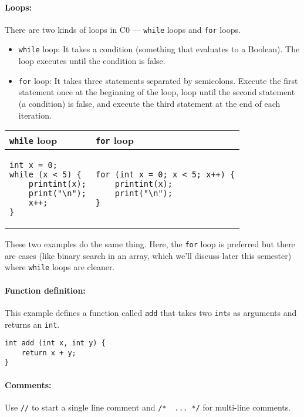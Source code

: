 \paragraph{Loops:}
There are two kinds of loops in C0 --- \lstinline'while' loops and
\lstinline'for' loops.
\begin{itemize}
\item \lstinline'while' loop: %
  It takes a condition (something that evaluates to a Boolean). The
  loop executes until the condition is false.
\item \lstinline'for' loop: %
  It takes three statements separated by semicolons. Execute the first
  statement once at the beginning of the loop, loop until the second
  statement (a condition) is false, and execute the third statement at
  the end of each iteration.
\end{itemize}
\begin{center}
\smalllistings
\begin{tabular}{p{120px} p{180px}}
  \lstinline'while' loop & \lstinline'for' loop
\\\hline
\begin{lstlisting}[aboveskip=0pt, belowskip=-4ex]
int x = 0;
while (x < 5) {
    printint(x);
    print("\n");
    x++;
}
\end{lstlisting}
 &
\begin{lstlisting}[aboveskip=0pt, belowskip=-4ex]
for (int x = 0; x < 5; x++) {
    printint(x);
    print("\n");
}
\end{lstlisting}
\end{tabular}
\end{center}

These two examples do the same thing.  Here, the \lstinline'for' loop is
preferred but there are cases (like binary search in an array, which
we'll discuss later this semester) where \lstinline'while' loops are
cleaner.

\paragraph{Function definition:}
This example defines a function called \lstinline'add' that takes two
\lstinline'int's as arguments and returns an \lstinline'int'.
\begin{lstlisting}
int add (int x, int y) {
    return x + y;
}
\end{lstlisting}

\paragraph{Comments:}
Use \lstinline'//' to start a single line comment and %
\lstinline'/*  ... */' for multi-line comments.


